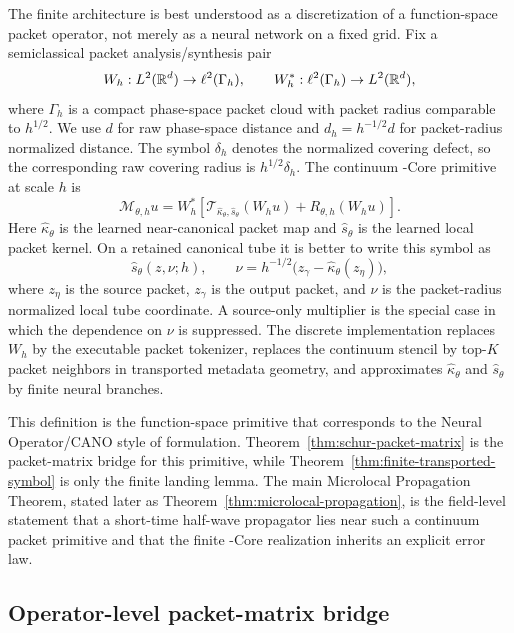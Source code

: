 The finite architecture is best understood as a discretization of a function-space packet operator, not merely as a neural network on a fixed grid.  Fix a semiclassical packet analysis/synthesis pair
\[
W_h:L^2(\mathbb R^d)\to \ell^2(\Gamma_h),
\qquad
W_h^\ast:\ell^2(\Gamma_h)\to L^2(\mathbb R^d),
\]
where $\Gamma_h$ is a compact phase-space packet cloud with packet radius comparable to $h^{1/2}$.  We use $d$ for raw phase-space distance and
$d_h=h^{-1/2}d$ for packet-radius normalized distance.  The symbol $\delta_h$
denotes the normalized covering defect, so the corresponding raw covering
radius is $h^{1/2}\delta_h$.  The continuum \MiNO-Core primitive at scale $h$ is
\[
\mathcal M_{\theta,h}u
=
W_h^\ast
\left[
\mathcal T_{\widehat\kappa_\theta,\widehat s_\theta}(W_hu)
+R_{\theta,h}(W_hu)
\right].
\]
Here $\widehat\kappa_\theta$ is the learned near-canonical packet map and $\widehat s_\theta$ is the learned local packet kernel.  On a retained canonical tube it is better to write this symbol as
\[
\widehat s_\theta(z,\nu;h),
\qquad
\nu=h^{-1/2}\bigl(z_\gamma-\widehat\kappa_\theta(z_\eta)\bigr),
\]
where $z_\eta$ is the source packet, $z_\gamma$ is the output packet, and $\nu$ is the packet-radius normalized local tube coordinate.  A source-only multiplier is the special case in which the dependence on $\nu$ is suppressed.  The discrete implementation replaces $W_h$ by the executable packet tokenizer, replaces the continuum stencil by top-$K$ packet neighbors in transported metadata geometry, and approximates $\widehat\kappa_\theta$ and $\widehat s_\theta$ by finite neural branches.

This definition is the function-space primitive that corresponds to the Neural Operator/CANO style of formulation.  Theorem~\ref{thm:schur-packet-matrix} is the packet-matrix bridge for this primitive, while Theorem~\ref{thm:finite-transported-symbol} is only the finite landing lemma.  The main Microlocal Propagation Theorem, stated later as Theorem~\ref{thm:microlocal-propagation}, is the field-level statement that a short-time half-wave propagator lies near such a continuum packet primitive and that the finite \MiNO-Core realization inherits an explicit error law.

\subsection{Operator-level packet-matrix bridge}
\label{sec:operator-packet-matrix-bridge}

